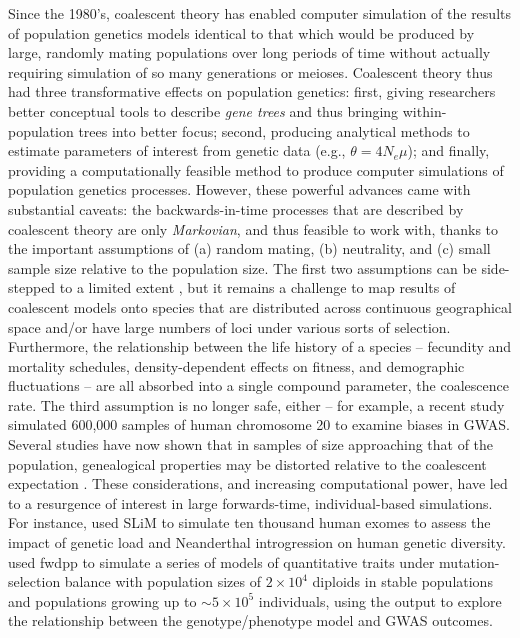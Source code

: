 \documentclass{article}
\begin{document}
Since the 1980's, coalescent theory has enabled computer simulation of the results of population genetics models
identical to that which would be produced by large, randomly mating populations over long periods of time
without actually requiring simulation of so many generations or meioses.
Coalescent theory thus had three transformative effects on population genetics:
first, giving researchers better conceptual tools to describe \emph{gene trees} and thus bringing within-population trees into better focus;
second, producing analytical methods to estimate parameters of interest from genetic data (e.g., $\theta = 4N_e \mu$);
and finally, providing a computationally feasible method to produce computer simulations of population genetics processes.
However, these powerful advances came with substantial caveats:
the backwards-in-time processes that are described by coalescent theory
are only \emph{Markovian}, and thus feasible to work with,
thanks to the important assumptions of
(a) random mating,
(b) neutrality,
and (c) small sample size relative to the population size.
The first two assumptions can be side-stepped to a limited extent \citep{Neuhauser1997-nn, hudson1990gene},
but it remains a challenge to map results of coalescent models
onto species that are distributed across continuous geographical space
and/or have large numbers of loci under various sorts of selection.
Furthermore, the relationship between the life history of a species --
fecundity and mortality schedules, density-dependent effects on fitness, and demographic fluctuations --
are all absorbed into a single compound parameter, the coalescence rate.
The third assumption is no longer safe, either --
for example, a recent study~\citep{martin2017human}
simulated 600,000 samples of human chromosome 20 to examine biases in GWAS.
Several studies have now shown that in samples of size approaching that of the population,
genealogical properties may be distorted relative to the coalescent expectation
\citep{wakeley2003gene,maruvka2011recovering,bhaskar2014distortion}.
These considerations, and increasing computational power, have led to a resurgence of
interest in large forwards-time, individual-based simulations.
For instance, \citet{harris2016genetic} used SLiM \citep{slim} to simulate ten thousand human exomes
to assess the impact of genetic load and Neanderthal introgression on human genetic diversity.
\cite{Sanjak2017-ko} used
fwdpp \citep{fwdpp} to simulate a series of models of quantitative traits under mutation-selection balance with
population sizes of $2 \times 10^4$ diploids in stable populations and populations growing up to $\sim 5
\times 10^5$ individuals, using the output to explore the relationship between the genotype/phenotype model and GWAS
outcomes.
\end{document}
